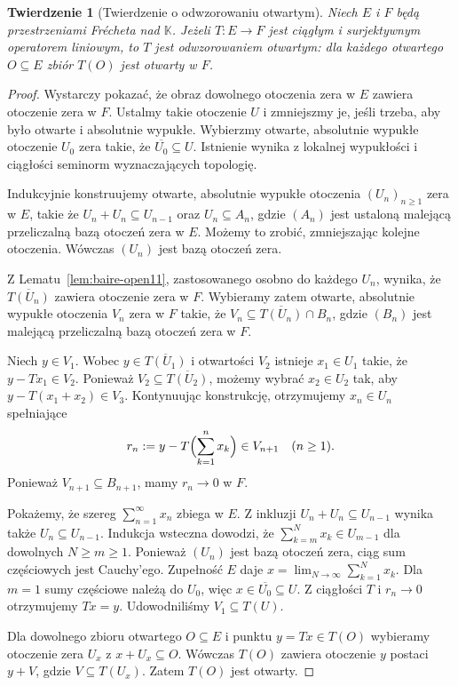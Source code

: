 \documentclass[11pt,a4paper]{article}
\numberwithin{equation}{section}
\theoremstyle{plain}
\newtheorem{twierdzenie}{Twierdzenie}[section]
\theoremstyle{definition}
\theoremstyle{remark}
\newcommand{\K}{\mathbb K}
\begin{document}
\begin{twierdzenie}[Twierdzenie o odwzorowaniu otwartym]\label{thm:open-mapping11}
Niech $E$ i $F$ będą przestrzeniami Frécheta nad $\K$.
Jeżeli $T:E\to F$ jest ciągłym i surjektywnym
operatorem liniowym, to $T$ jest odwzorowaniem otwartym:
dla każdego otwartego $O\subseteq E$ zbiór $T(O)$
jest otwarty w $F$.
\end{twierdzenie}
\begin{proof}
Wystarczy pokazać, że obraz dowolnego otoczenia zera
w $E$ zawiera otoczenie zera w $F$. Ustalmy takie
otoczenie $U$ i zmniejszmy je, jeśli trzeba, aby było
otwarte i absolutnie wypukłe. Wybierzmy otwarte,
absolutnie wypukłe otoczenie $U_0$ zera takie, że
$\overline{U_0}\subseteq U$. Istnienie wynika z lokalnej
wypukłości i ciągłości seminorm wyznaczających topologię.

Indukcyjnie konstruujemy otwarte, absolutnie wypukłe
otoczenia $(U_n)_{n\ge1}$ zera w $E$, takie że
$U_n+U_n\subseteq U_{n-1}$ oraz $U_n\subseteq A_n$,
gdzie $(A_n)$ jest ustaloną malejącą przeliczalną bazą
otoczeń zera w $E$. Możemy to zrobić, zmniejszając
kolejne otoczenia. Wówczas $(U_n)$ jest bazą otoczeń zera.

Z Lematu~\ref{lem:baire-open11}, zastosowanego osobno
do każdego $U_n$, wynika, że
$\overline{T(U_n)}$ zawiera otoczenie zera w $F$.
Wybieramy zatem otwarte, absolutnie wypukłe otoczenia
$V_n$ zera w $F$ takie, że
$V_n\subseteq\overline{T(U_n)}\cap B_n$, gdzie $(B_n)$
jest malejącą przeliczalną bazą otoczeń zera w $F$.

Niech $y\in V_1$. Wobec $y\in\overline{T(U_1)}$
i otwartości $V_2$ istnieje $x_1\in U_1$ takie, że
$y-Tx_1\in V_2$. Ponieważ $V_2\subseteq\overline{T(U_2)}$,
możemy wybrać $x_2\in U_2$ tak, aby
$y-T(x_1+x_2)\in V_3$. Kontynuując konstrukcję,
otrzymujemy $x_n\in U_n$ spełniające
\[
 r_n:=y-T\Bigl(\sum_{k=1}^n x_k\Bigr)\in V_{n+1}
 \quad (n\ge1).
\]
Ponieważ $V_{n+1}\subseteq B_{n+1}$, mamy $r_n\to0$ w $F$.

Pokażemy, że szereg $\sum_{n=1}^\infty x_n$ zbiega w $E$.
Z inkluzji $U_n+U_n\subseteq U_{n-1}$ wynika także
$U_n\subseteq U_{n-1}$. Indukcja wsteczna dowodzi, że
$\sum_{k=m}^N x_k\in U_{m-1}$ dla dowolnych $N\ge m\ge1$.
Ponieważ $(U_n)$ jest bazą otoczeń zera, ciąg sum częściowych
jest Cauchy'ego. Zupełność $E$ daje
$x=\lim_{N\to\infty}\sum_{k=1}^N x_k$.
Dla $m=1$ sumy częściowe należą do $U_0$, więc
$x\in\overline{U_0}\subseteq U$. Z ciągłości $T$ i
$r_n\to0$ otrzymujemy $Tx=y$. Udowodniliśmy
$V_1\subseteq T(U)$.

Dla dowolnego zbioru otwartego $O\subseteq E$ i punktu
$y=Tx\in T(O)$ wybieramy otoczenie zera $U_x$ z
$x+U_x\subseteq O$. Wówczas $T(O)$ zawiera otoczenie
$y$ postaci $y+V$, gdzie $V\subseteq T(U_x)$.
Zatem $T(O)$ jest otwarty.
\end{proof}
\end{document}
